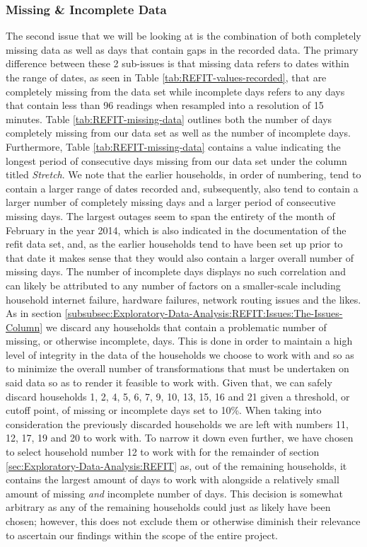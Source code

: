 \subsubsection{Missing \& Incomplete Data}
\label{subsubsec:Exploratory-Data-Analysis:REFIT:Issues:Missing-and-Incomplete-Data}
The second issue that we will be looking at is the combination of both completely missing data as well as days that contain gaps in the recorded data. The primary difference between these 2 sub-issues is that missing data refers to dates within the range of dates, as seen in Table \ref{tab:REFIT-values-recorded}, that are completely missing from the data set while incomplete days refers to any days that contain less than 96 readings when resampled into a resolution of 15 minutes. Table \ref{tab:REFIT-missing-data} outlines both the number of days completely missing from our data set as well as the number of incomplete days. Furthermore, Table \ref{tab:REFIT-missing-data} contains a value indicating the longest period of consecutive days missing from our data set under the column titled \textit{Stretch}. We note that the earlier households, in order of numbering, tend to contain a larger range of dates recorded and, subsequently, also tend to contain a larger number of completely missing days and a larger period of consecutive missing days. The largest outages seem to span the entirety of the month of February in the year 2014, which is also indicated in the documentation of the \gls{refit} data set, and, as the earlier households tend to have been set up prior to that date it makes sense that they would also contain a larger overall number of missing days. The number of incomplete days displays no such correlation and can likely be attributed to any number of factors on a smaller-scale including household internet failure, hardware failures, network routing issues and the likes. As in section \ref{subsubsec:Exploratory-Data-Analysis:REFIT:Issues:The-Issues-Column} we discard any households that contain a problematic number of missing, or otherwise incomplete, days. This is done in order to maintain a high level of integrity in the data of the households we choose to work with and so as to minimize the overall number of transformations that must be undertaken on said data so as to render it feasible to work with. Given that, we can safely discard households 1, 2, 4, 5, 6, 7, 9, 10, 13, 15, 16 and 21 given a threshold, or cutoff point, of missing or incomplete days set to 10\%. When taking into consideration the previously discarded households we are left with numbers 11, 12, 17, 19 and 20 to work with. To narrow it down even further, we have chosen to select household number 12 to work with for the remainder of section \ref{sec:Exploratory-Data-Analysis:REFIT} as, out of the remaining households, it contains the largest amount of days to work with alongside a relatively small amount of missing \textit{and} incomplete number of days. This decision is somewhat arbitrary as any of the remaining households could just as likely have been chosen; however, this does not exclude them or otherwise diminish their relevance to ascertain our findings within the scope of the entire project.

